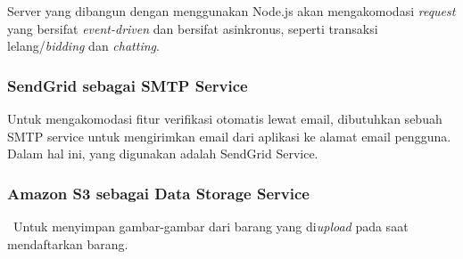     Server yang dibangun dengan menggunakan Node.js akan mengakomodasi \textit{request} yang bersifat \textit{event-driven} dan bersifat asinkronus, seperti transaksi lelang/\textit{bidding} dan \textit{chatting}.
    
    \subsubsection{\textbf{SendGrid} sebagai SMTP Service}
    
    Untuk mengakomodasi fitur verifikasi otomatis lewat email, dibutuhkan sebuah SMTP service untuk mengirimkan email dari aplikasi ke alamat email pengguna. Dalam hal ini, yang digunakan adalah SendGrid Service.
    
    \subsubsection{\textbf{Amazon S3} sebagai Data Storage Service}
    \
    Untuk menyimpan gambar-gambar dari barang yang di\textit{upload} pada saat mendaftarkan barang.

      
   
   
      
    